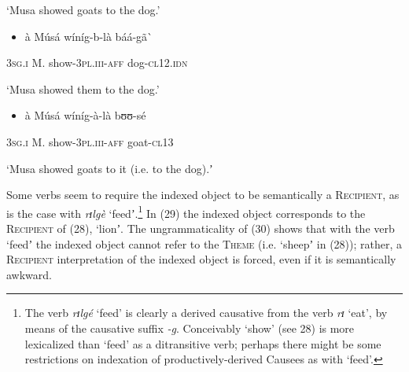 \documentclass[output=paper]{langsci/langscibook}
\begin{document}
{{\begin{styleTranslation}
‘Musa showed goats to the dog.’
\end{styleTranslation}

\begin{itemize}
\item \begin{styleNumberedEX}
\`{a}    M\'{u}s\'{a}  w\'{i}n\'{i}g-b-l\`{a}    b\'{a}\'{a}-g\~{a}\`{ }
\end{styleNumberedEX}\end{itemize}
\begin{styleGloss}
\textsc{3sg.i    }M.  show-\textsc{3pl.iii-aff}  dog-\textsc{cl12.idn}
\end{styleGloss}

\begin{styleTranslation}
‘Musa showed them to the dog.’  
\end{styleTranslation}

\begin{itemize}
\item \begin{styleNumberedEX}
\label{bkm:Ref424317424}\`{a}    M\'{u}s\'{a}  w\'{i}n\'{i}g-\`{a}-l\`{a}    bʊʊ-s\'{e}
\end{styleNumberedEX}\end{itemize}
\begin{styleGloss}
\textsc{3sg.i  }  M.  show-\textsc{3pl.iii-aff}  goat-\textsc{cl13}
\end{styleGloss}

\begin{styleTranslation}
‘Musa showed goats to it (i.e. to the dog).ʼ
\end{styleTranslation}

Some verbs seem to require the indexed object to be semantically a \textsc{Recipient}, as is the case with \textit{rɪlg\`{e}} ‘feedʼ.\footnote{ The verb \textit{rɪlg\'{e}} ‘feed’ is clearly a derived causative from the verb \textit{rɪ} ‘eat’, by means of the causative suffix \textit{{}-g}. Conceivably ‘show’ (see 28) is more lexicalized than ‘feed’ as a ditransitive verb; perhaps there might be some restrictions on indexation of productively-derived Causees as with ‘feed’.}{ }In (29) the indexed object corresponds to the \textsc{Recipient} of (28), ‘lionʼ. The ungrammaticality of (30) shows that with the verb ‘feedʼ the indexed object cannot refer to the \textsc{Theme} (i.e. ‘sheepʼ in (28)); rather, a \textsc{Recipient} interpretation of the indexed object is forced, even if it is semantically awkward.

}}
\end{document}
